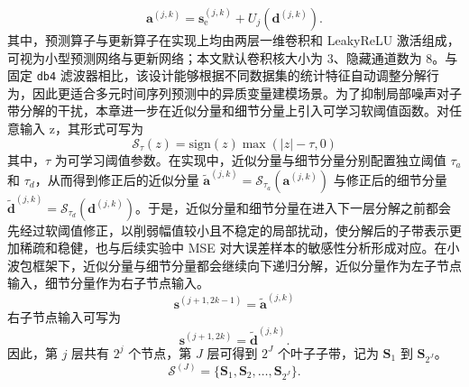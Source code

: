 \begin{equation}
\mathbf{a}^{(j,k)}=\mathbf{s}^{(j,k)}_{\mathrm{e}}+U_j\!\left(\mathbf{d}^{(j,k)}\right).
\label{eq:chap4-approx}
\end{equation}
其中，预测算子与更新算子在实现上均由两层一维卷积和 LeakyReLU 激活组成，可视为小型预测网络与更新网络；本文默认卷积核大小为 3、隐藏通道数为 8。与固定 \texttt{db4} 滤波器相比，该设计能够根据不同数据集的统计特征自动调整分解行为，因此更适合多元时间序列预测中的异质变量建模场景\cite{daubechies1992ten}。为了抑制局部噪声对子带分解的干扰，本章进一步在近似分量和细节分量上引入可学习软阈值函数\cite{donoho1994waveshrink}。对任意输入 z，其形式可写为
\begin{equation}
\mathcal{S}_{\tau}(z)=\mathrm{sign}(z)\max(|z|-\tau,0)
\label{eq:chap4-soft-threshold}
\end{equation}
其中，$\tau$ 为可学习阈值参数。在实现中，近似分量与细节分量分别配置独立阈值 $\tau_a$ 和 $\tau_d$，从而得到修正后的近似分量 $\tilde{\mathbf{a}}^{(j,k)}=\mathcal{S}_{\tau_a}(\mathbf{a}^{(j,k)})$ 与修正后的细节分量 $\tilde{\mathbf{d}}^{(j,k)}=\mathcal{S}_{\tau_d}(\mathbf{d}^{(j,k)})$。于是，近似分量和细节分量在进入下一层分解之前都会先经过软阈值修正，以削弱幅值较小且不稳定的局部扰动，使分解后的子带表示更加稀疏和稳健，也与后续实验中 MSE 对大误差样本的敏感性分析形成对应。在小波包框架下，近似分量与细节分量都会继续向下递归分解，近似分量作为左子节点输入，细节分量作为右子节点输入。
\begin{equation}
\mathbf{s}^{(j+1,2k-1)}=\tilde{\mathbf{a}}^{(j,k)}
\label{eq:chap4-left-child}
\end{equation}
右子节点输入可写为
\begin{equation}
\mathbf{s}^{(j+1,2k)}=\tilde{\mathbf{d}}^{(j,k)}.
\label{eq:chap4-right-child}
\end{equation}
因此，第 $j$ 层共有 $2^j$ 个节点，第 $J$ 层可得到 $2^J$ 个叶子子带，记为 $\mathbf{S}_1$ 到 $\mathbf{S}_{2^J}$。
\begin{equation}
\mathcal{S}^{(J)}=\{\mathbf{S}_1,\mathbf{S}_2,\dots,\mathbf{S}_{2^J}\}.
\label{eq:chap4-wpd-set}
\end{equation}
